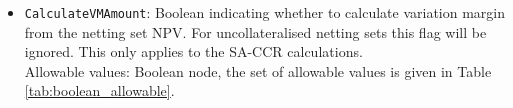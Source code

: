 \begin{itemize}
  \item \lstinline!CalculateVMAmount!: Boolean indicating whether to calculate
    variation margin from the netting set NPV. For uncollateralised netting
    sets this flag will be ignored. This only applies to the SA-CCR
    calculations. \\
    Allowable values: Boolean node, the set of allowable values is given in
    Table \ref{tab:boolean_allowable}.
\end{itemize}
